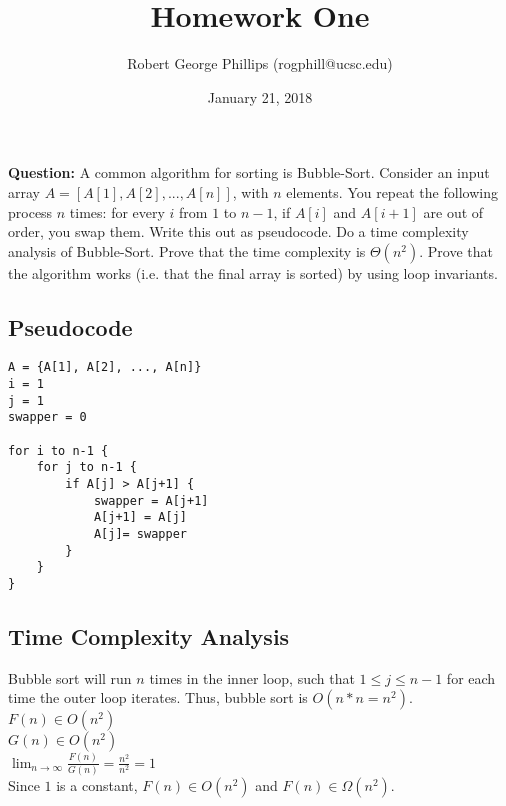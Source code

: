 \documentclass[a4paper,12pt]{article}
\title{Homework One}
\author{Robert George Phillips (rogphill@ucsc.edu)}
\date{January 21, 2018}
\begin{document}
\maketitle

\section{}

\textbf{Question:} A common algorithm for sorting is Bubble-Sort. Consider an input array $A = [A[1], A[2], . . . , A[n]]$, with $n$ elements. You repeat the
following process $n$ times: for every $i$ from $1$ to $ n - 1$, if $A[i]$ and $A[i + 1]$ are out of order, you swap them. Write this out as pseudocode. Do a time complexity analysis of Bubble-Sort. Prove that the time complexity is $\Theta(n^2)$. Prove that the algorithm works (i.e. that the final array is sorted) by using loop invariants.\\


\subsection{Pseudocode}

\begin{verbatim}
A = {A[1], A[2], ..., A[n]}
i = 1
j = 1
swapper = 0

for i to n-1 {
    for j to n-1 {
        if A[j] > A[j+1] {
            swapper = A[j+1]
            A[j+1] = A[j]
            A[j]= swapper			
        }
    }
}
\end{verbatim}

\subsection{Time Complexity Analysis}

Bubble sort will run $n$ times in the inner loop, such that $1 \leq j \leq n-1$ for each time the outer loop iterates. Thus, bubble sort is $O(n*n=n^2)$.\\

$F(n) \in O(n^2)$\\

$G(n) \in O(n^2)$\\

$\lim_{n\to\infty} \frac{F(n)}{G(n)} = \frac{n^2}{n^2} = 1$\\

Since $1$ is a constant, $F(n) \in O(n^2)$ and $F(n) \in \Omega(n^2)$.\\
\end{document}

